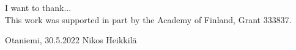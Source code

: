 I want to thank...\\
This work was supported in part by the Academy of Finland, Grant 333837.
\vspace{5cm}

Otaniemi, 30.5.2022
\vspace{5mm}
{\hfill Nikos Heikkilä \hspace{1cm}}

